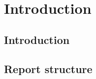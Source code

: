 
\chapter{Introduction}
\label{chap:introduction}
\ifpdf
    \graphicspath{{Introduction/Figures/PNG/}{Introduction/Figures/PDF/}{Introduction/Figures/}}
\else
    \graphicspath{{Introduction/Figures/EPS/}{Introduction/Figures/}}
\fi




  

\section{Introduction}
\label{introduction}

\section{Report structure}
\label{structure}
